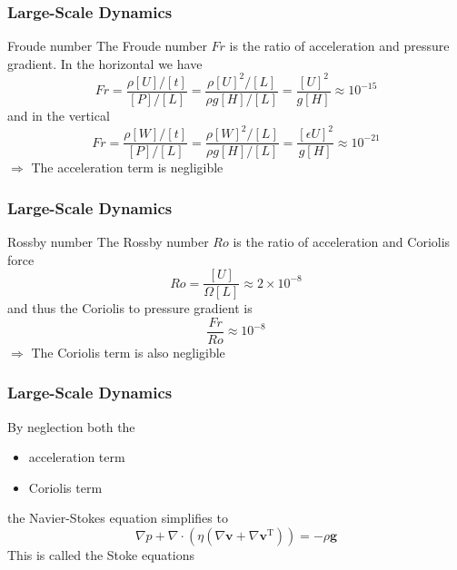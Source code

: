 \documentclass[hide notes,intlimits]{beamer}
\begin{document}
\begin{frame}
  \frametitle{Large-Scale Dynamics}
  \begin{block}{Froude number}
    The \alert{Froude number $Fr$} is the ratio of acceleration and pressure gradient. In the horizontal we have
  \begin{equation*}
    Fr = \frac{\rho[U]/[t]}{[P]/[L]} = \frac{\rho[U]^{2}/[L]}{\rho g [H]/[L]} = \frac{[U]^{2}}{g[H]} \approx 10^{-15}
  \end{equation*}
  and in the vertical
  \begin{equation*}
    Fr = \frac{\rho[W]/[t]}{[P]/[L]} = \frac{\rho[W]^{2}/[L]}{\rho g [H]/[L]} = \frac{[\epsilon U]^{2}}{g[H]} \approx 10^{-21}
  \end{equation*}
  $\Rightarrow$ The \alert{acceleration term} is \alert{negligible}
  \end{block}
\end{frame}


\begin{frame}
  \frametitle{Large-Scale Dynamics}
  \begin{block}{Rossby number}
    The \alert{Rossby number $Ro$} is the ratio of acceleration and Coriolis force
  \begin{equation*}
    Ro = \frac{[U]}{\Omega [L]} \approx 2\times10^{-8}
  \end{equation*}
  and thus the Coriolis to pressure gradient is
  \begin{equation*}
   \frac{Fr}{Ro}\approx 10^{-8}
  \end{equation*}
  $\Rightarrow$ The \alert{Coriolis term} is also \alert{negligible}
  \end{block}
\end{frame}


\begin{frame}
  \frametitle{Large-Scale Dynamics}
  By neglection both the
  \begin{itemize}
    \item acceleration term
    \item Coriolis term
   \end{itemize}
   the Navier-Stokes equation simplifies to
 \begin{equation*}
    \nabla p + \nabla \cdot \left(\eta\left(\nabla \mathbf{v} + \nabla \mathbf{v}^{\text{T}}\right)\right) = - \rho \mathbf{g}
  \end{equation*}
  This is called the \alert{Stoke equations}
\end{frame}
\end{document}
